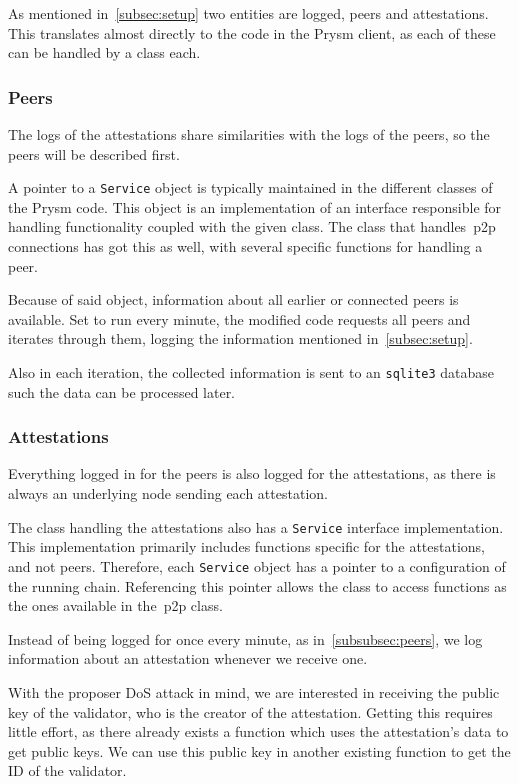 As mentioned in~\autoref{subsec:setup} two entities are logged, peers and attestations.
This translates almost directly to the code in the Prysm client, as each of these can be handled by a class each.

\subsubsection{Peers}\label{subsubsec:peers}
The logs of the attestations share similarities with the logs of the peers, so the peers will be described first.

A pointer to a \texttt{Service} object is typically maintained in the different classes of the Prysm code.
This object is an implementation of an interface responsible for handling functionality coupled with the given class.
The class that handles~\gls{p2p} connections has got this as well, with several specific functions for handling a peer.

Because of said object, information about all earlier or connected peers is available.
Set to run every minute, the modified code requests all peers and iterates through them,
logging the information mentioned in~\autoref{subsec:setup}.


Also in each iteration,
the collected information is sent to an \texttt{sqlite3} database such the data can be processed later.

\subsubsection{Attestations}\label{subsubsec:attestations}
Everything logged in for the peers is also logged for the attestations,
as there is always an underlying node sending each attestation.

The class handling the attestations also has a \texttt{Service} interface implementation.
This implementation primarily includes functions specific for the attestations, and not peers.
Therefore, each \texttt{Service} object has a pointer to a configuration of the running chain.
Referencing this pointer allows the class to access functions as the ones available in the~\gls{p2p} class.

Instead of being logged for once every minute, as in~\autoref{subsubsec:peers},
we log information about an attestation whenever we receive one.

With the proposer DoS attack in mind, we are interested in receiving the public key of the validator,
who is the creator of the attestation.
Getting this requires little effort,
as there already exists a function which uses the attestation's data to get public keys.
We can use this public key in another existing function to get the ID of the validator.

